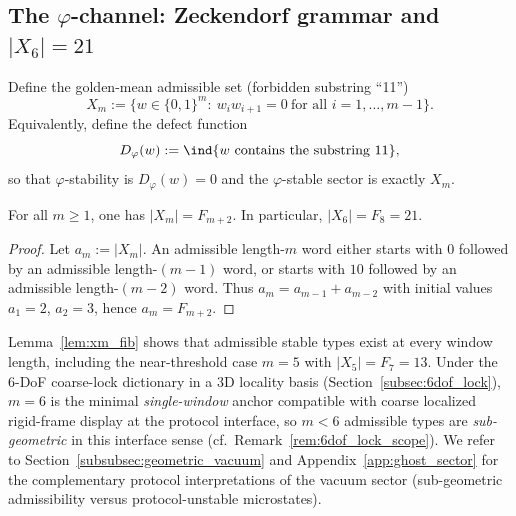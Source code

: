 \subsection{The \texorpdfstring{$\varphi$}{phi}-channel: Zeckendorf grammar and \texorpdfstring{$|X_6|=21$}{|X6|=21}}
\label{subsec:phi_channel}

Define the golden-mean admissible set (forbidden substring ``11'')
\begin{equation}\label{eq:Xm_def}
X_m:=\{w\in\{0,1\}^m:\ w_i w_{i+1}=0\ \text{for all }i=1,\dots,m-1\}.
\end{equation}
Equivalently, define the defect function
\[
D_\varphi(w):=\ind\{w\text{ contains the substring }11\},
\]
so that $\varphi$-stability is $D_\varphi(w)=0$ and the $\varphi$-stable sector is exactly $X_m$.

\begin{lemma}\label{lem:xm_fib}
For all $m\ge 1$, one has $|X_m|=F_{m+2}$. In particular, $|X_6|=F_8=21$.
\end{lemma}
\begin{proof}
Let $a_m:=|X_m|$.
An admissible length-$m$ word either starts with $0$ followed by an admissible length-$(m-1)$ word, or starts with $10$ followed by an admissible length-$(m-2)$ word.
Thus $a_m=a_{m-1}+a_{m-2}$ with initial values $a_1=2$, $a_2=3$, hence $a_m=F_{m+2}$.
\end{proof}

\begin{remark}\label{rem:subgeometric_xm}
Lemma~\ref{lem:xm_fib} shows that admissible stable types exist at every window length, including the near-threshold case $m=5$ with $|X_5|=F_7=13$.
Under the 6-DoF coarse-lock dictionary in a $3$D locality basis (Section~\ref{subsec:6dof_lock}), $m=6$ is the minimal \emph{single-window} anchor compatible with coarse localized rigid-frame display at the protocol interface, so $m<6$ admissible types are \emph{sub-geometric} in this interface sense (cf.\ Remark~\ref{rem:6dof_lock_scope}).
We refer to Section~\ref{subsubsec:geometric_vacuum} and Appendix~\ref{app:ghost_sector} for the complementary protocol interpretations of the vacuum sector (sub-geometric admissibility versus protocol-unstable microstates).
\end{remark}

